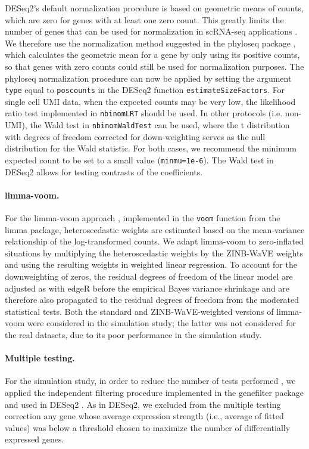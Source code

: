 \documentclass{bmcart}
\newcommand{\RPack}[1]{\textsf{#1}}
\newcommand{\RCmd}[1]{\texttt{#1}}
\newcommand{\RObj}[1]{\texttt{#1}}
\begin{document}
\RPack{DESeq2}'s default normalization procedure is based on geometric means of counts, which are zero for genes with at least one zero count. This greatly limits the number of genes that can be used for normalization in scRNA-seq applications \citep{Vallejos2017NormalizingOpportunities}. We therefore use the normalization method suggested in the \RPack{phyloseq} package \citep{McMurdie2013}, which calculates the geometric mean for a gene by only using its positive counts, so that genes with zero counts could still be used for normalization purposes. The \RPack{phyloseq} normalization procedure can now be applied by setting the argument \RObj{type} equal to \RObj{poscounts} in the \RPack{DESeq2} function \RObj{estimateSizeFactors}. For single cell UMI data, when the expected counts may be very low, the likelihood ratio test implemented in \RCmd{nbinomLRT} should be used. In other protocols (i.e. non-UMI), the Wald test in \RCmd{nbinomWaldTest} can be used, where the t distribution with degrees of freedom corrected for down-weighting serves as the null distribution for the Wald statistic. For both cases, we recommend the minimum expected count to be set to a small value (\RCmd{minmu=1e-6}). The Wald test in \RPack{DESeq2} allows for testing contrasts of the coefficients.

\paragraph{limma-voom.}
For the limma-voom approach \citep{Law2014}, implemented in the \RObj{voom} function from the \RPack{limma} package, heteroscedastic weights are estimated based on the mean-variance relationship of the log-transformed counts. We adapt limma-voom to zero-inflated situations by multiplying the heteroscedastic weights by the ZINB-WaVE weights and using the resulting weights in weighted linear regression. To account for the downweighting of zeros, the residual degrees of freedom of the linear model are adjusted as with \RPack{edgeR} before the empirical Bayes variance shrinkage and are therefore also propagated to the residual degrees of freedom from the moderated statistical tests. 
Both the standard and ZINB-WaVE-weighted versions of limma-voom were considered in the simulation study; the latter was not considered for the real datasets, due to its poor performance in the simulation study. 

\paragraph{Multiple testing.} 
For the simulation study, in order to reduce the number of tests performed \citep{Bourgon2010}, we applied the independent filtering procedure implemented in the \RPack{genefilter} package and used in \RPack{DESeq2} \citep{Love2014}. As in \RPack{DESeq2}, we excluded from the multiple testing correction any gene whose average expression strength (i.e., average of fitted values) was below a threshold chosen to maximize the number of differentially expressed genes. 
\end{document}
